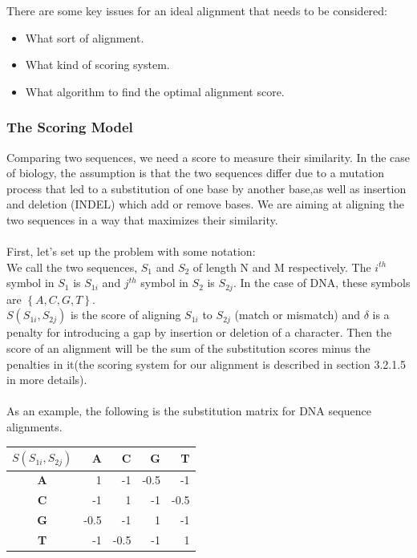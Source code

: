 \documentclass[11pt,a4paper]{report}
\begin{document}
There are some key issues for an ideal alignment that needs to be considered:

\begin{itemize} 
	\item  What sort of alignment.
	\item  What kind of scoring system.
	\item  What algorithm to find the optimal alignment score.
\end{itemize}





\subsubsection{The Scoring Model} \label{The Scoring Model}

Comparing two sequences, we need a score to measure their similarity.
In the case of biology, the assumption is that the two sequences differ
due to a mutation process that led to a substitution 
of one base by another base,as well as insertion and deletion (INDEL) which add or remove bases.
We are aiming at aligning the two sequences in a way that maximizes their similarity.\\ \\
First, let's set up the problem with some notation:\\
We call the two sequences, $S_{1}$ and $S_{2}$ of length N and M respectively. 
The $i^{th}$ symbol in $S_{1}$ is $S_{1i}$ and $j^{th}$ symbol in $S_{2}$ is $S_{2j}$. 
In the case of DNA, these symbols are $\left\{A, C, G, T\right\}$.\\
$S(S_{1i}, S_{2j})$ is the score of aligning $S_{1i}$ to $S_{2j}$ (match or mismatch)
and $\delta$ is a penalty for introducing a gap by insertion or deletion of a character. 
Then the score of an alignment will be the sum of the substitution scores minus the 
penalties in it(the scoring system for our alignment is described in section 3.2.1.5 in more details).\\\\
As an example, the following is the substitution matrix for DNA sequence alignments.


\begin{table}[H]
 \centering
  \begin{tabular}{  c| r  r r  r }
    
  \textbf{  $S(S_{1i}, S_{2j})$ } & \textbf{A} &\textbf{ C} &\textbf{ G} &\textbf{ T} \\ \hline
       \textbf{A} &  1  & -1 & -0.5 & -1 \\
       \textbf{C} & -1  & 1 & -1 & -0.5 \\ 
       \textbf{G} & -0.5 & -1 & 1 & -1 \\ 
       \textbf{T} & -1 & -0.5 & -1 & 1
    \end{tabular}
\label{alignment-exp}
\end{table}
\end{document}

